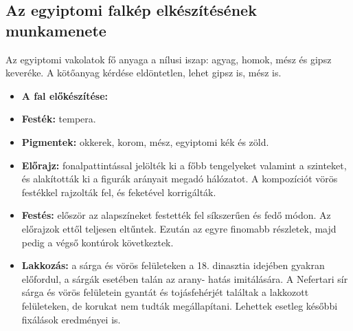 \subsection*{Az egyiptomi falkép elkészítésének munkamenete}

Az egyiptomi vakolatok fő anyaga a nílusi iszap: agyag, homok, mész és gipsz keveréke. A kötőanyag kérdése eldöntetlen, lehet gipsz is, mész is.

\begin{itemize}
	\item \textbf{A fal előkészítése:} 
	
	\item \textbf{Festék:} tempera.
	
	\item \textbf{Pigmentek:} okkerek, korom, mész, egyiptomi kék és zöld.
	
	\item \textbf{Előrajz:} fonalpattintással jelölték ki a főbb tengelyeket
	valamint a szinteket, és alakították ki a figurák arányait megadó hálózatot. A kompozíciót vörös festékkel rajzolták fel, és feketével korrigálták.
	
	\item \textbf{Festés:} először az alapszíneket festették fel síkszerűen és
	fedő módon. Az előrajzok ettől teljesen eltűntek. Ezután az egyre finomabb részletek, majd pedig a végső kontúrok következtek.
	
	\item \textbf{Lakkozás:} a sárga és vörös felületeken a 18. dinasztia idejében gyakran előfordul, a sárgák esetében talán az arany-
	hatás imitálására. A Nefertari sír sárga és vörös felületein gyantát és tojásfehérjét találtak a lakkozott felületeken, de korukat nem tudták megállapítani. Lehettek esetleg későbbi fixálások eredményei is.
\end{itemize}